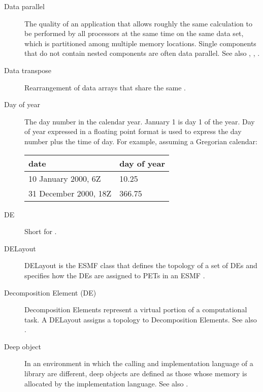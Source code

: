 \begin{description}
\label{glos:DataParallel}
\item[Data parallel] The quality of an application that allows roughly 
  the same calculation to be performed by all processors at the same 
  time on the same data set, which is partitioned among multiple memory 
  locations.  Single components that do not contain nested components
  are often data parallel.  See also 
  , , 
  .   

\label{glos:DataTranspose}
\item[Data transpose] Rearrangement of data arrays that share the 
  same .  

\label{glos:DayOfYear}
\item[Day of year] The day number in the calendar year. 
  January 1 is day 1 of the year. Day of year expressed in a floating point 
  format is used to express the day number plus the time of day. 
  For example, assuming a Gregorian calendar:

\begin{tabular}{ll}
  {\bf date}              & {\bf day of year} \\
  \hline 
  10 January 2000, 6Z     & 10.25 \\
  31 December 2000, 18Z   & 366.75 
\end{tabular}

\label{glos:DE}
\item[DE] 
  Short for .

\label{glos:DELayout}
\item[DELayout] DELayout is the ESMF class that
  defines the topology of a set of DEs and specifies 
  how the DEs are assigned to PETs in an ESMF  
  . 

\label{glos:Decomp_Element}
\item[Decomposition Element (DE)]
  Decomposition Elements represent a 
  virtual portion of a computational task.
  A DELayout assigns a topology to Decomposition Elements.
  See also .

\label{glos:DeepObjects}
\item[Deep object] In an environment
  in which the calling and implementation language of a library are
  different, deep objects are defined as those whose memory is 
  allocated by the implementation language. 
  See also . 


\end{description}
